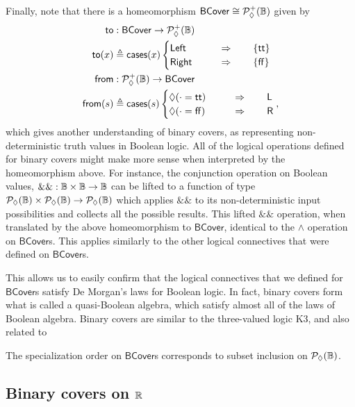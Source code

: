 Finally, note that there is a homeomorphism $\mathsf{BCover} \cong \mathcal{P}_\lozenge^+(\mathbb{B})$ given by
\begin{align*}
\mathsf{to} &: \mathsf{BCover} \to \mathcal{P}_\lozenge^+(\mathbb{B})
\\ \mathsf{to}(x) &\triangleq
  \mathsf{cases}(x)
  \begin{cases}
\mathsf{Left}
 \qquad &\Rightarrow \qquad
 \{ \mathsf{tt} \}
\\
\mathsf{Right}
 \qquad &\Rightarrow \qquad
 \{ \mathsf{ff} \}
  \end{cases}
\\
\mathsf{from} &: \mathcal{P}_\lozenge^+(\mathbb{B}) \to \mathsf{BCover}
\\ \mathsf{from}(s) &\triangleq
  \mathsf{cases}(s)
  \begin{cases}
\lozenge(\cdot =\mathsf{tt})
 \qquad &\Rightarrow \qquad
 \mathsf{L}
\\
\lozenge(\cdot =\mathsf{ff})
 \qquad &\Rightarrow \qquad
 \mathsf{R}
  \end{cases},
\end{align*}
which gives another understanding of binary covers, as representing non-deterministic truth values in Boolean logic. All of the logical operations defined for binary covers might make more sense when interpreted by the homeomorphism above. For instance, the conjunction operation on Boolean values,
$\&\& : \mathbb{B} \times \mathbb{B} \to \mathbb{B}$ can be lifted to a function of type $\mathcal{P}_\lozenge(\mathbb{B}) \times \mathcal{P}_\lozenge(\mathbb{B}) \to \mathcal{P}_\lozenge(\mathbb{B})$ which applies $\&\&$ to its non-deterministic input possibilities and collects all the possible results. This lifted $\&\&$ operation, when translated by the above homeomorphism to $\mathsf{BCover}$, identical to the $\wedge$ operation on $\mathsf{BCover}$s. This applies similarly to the other logical connectives that were defined on $\mathsf{BCover}$s.

This allows us to easily confirm that the logical connectives that we defined for $\mathsf{BCover}$s satisfy  De Morgan's laws for Boolean logic. In fact, binary covers form what is called a quasi-Boolean algebra, which satisfy almost all of the laws of Boolean algebra. Binary covers are similar to the three-valued logic K3, and also related to 

The specialization order on $\mathsf{BCover}$s corresponds to subset inclusion on $\mathcal{P}_\lozenge(\mathbb{B})$.

\subsection{Binary covers on $\mathbb{R}$}

